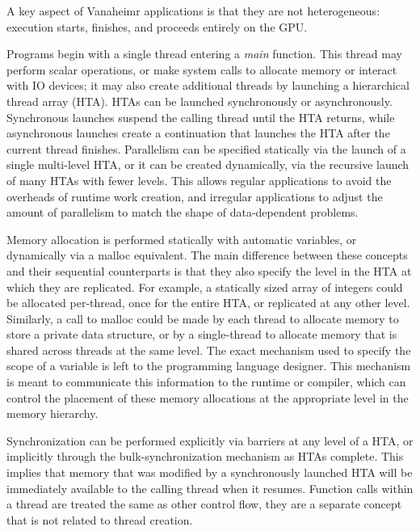 \documentclass[conference, 10pt]{IEEEtran}
\begin{document}
A key aspect of Vanaheimr applications is that they are not heterogeneous:
execution starts, finishes, and proceeds entirely on the GPU.  

Programs begin with a single thread entering a \textit{main} function.  This
thread may perform scalar operations, or make system calls to allocate memory or
interact with IO devices; it may also create additional threads by launching a
hierarchical thread array (HTA).  HTAs can be launched synchronously or
asynchronously.  Synchronous launches suspend the calling thread until the
HTA returns, while asynchronous
launches create a continuation that launches the HTA after the current thread
finishes.  Parallelism can be specified statically via the launch of a single
multi-level HTA, or it can be created dynamically, via the recursive launch of
many HTAs with fewer levels.  This allows regular applications to avoid the
overheads of runtime work creation, and irregular applications to adjust the
amount of parallelism to match the shape of data-dependent problems.

Memory allocation is performed statically with automatic variables, or
dynamically via a malloc equivalent.  The main difference between these concepts
and their sequential counterparts is that they also specify the level in the HTA
at which they are replicated.  For example, a statically sized array of integers
could be allocated per-thread, once for the entire HTA, or replicated at any
other level.  Similarly, a call to malloc could be made by each thread to
allocate memory to store a private data structure, or by a single-thread to
allocate memory that is shared across threads at the same level.  
The exact mechanism used to specify the scope of a variable is left to the 
programming language designer.  This mechanism is meant to communicate this 
information to the runtime or compiler, which can control the placement of these
memory allocations at the appropriate level in the memory hierarchy.  

Synchronization can be performed explicitly via barriers at any level of a HTA,
or implicitly through the bulk-synchronization mechanism as HTAs complete.  This
implies that memory that was modified by a synchronously launched HTA will be 
immediately available to the calling thread when it resumes.  Function calls
within a thread are treated the same as other control flow, they are a separate
concept that is not related to thread creation.
\end{document}
